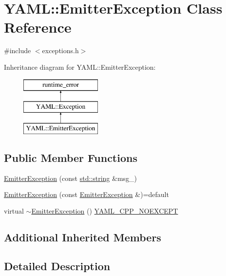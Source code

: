 \hypertarget{class_y_a_m_l_1_1_emitter_exception}{}\section{Y\+A\+ML\+::Emitter\+Exception Class Reference}
\label{class_y_a_m_l_1_1_emitter_exception}


{\ttfamily \#include $<$exceptions.\+h$>$}

Inheritance diagram for Y\+A\+ML\+::Emitter\+Exception\+:\begin{figure}[H]
\begin{center}
\leavevmode
\includegraphics[height=3.000000cm]{class_y_a_m_l_1_1_emitter_exception}
\end{center}
\end{figure}
\subsection*{Public Member Functions}
\begin{DoxyCompactItemize}
\item 
\mbox{\hyperlink{class_y_a_m_l_1_1_emitter_exception_ae5cf71bfcafe94019257f5ce795ed413}{Emitter\+Exception}} (const \mbox{\hyperlink{glad_8h_ac83513893df92266f79a515488701770}{std\+::string}} \&msg\+\_\+)
\item 
\mbox{\hyperlink{class_y_a_m_l_1_1_emitter_exception_ae482e8c4c2d72c46712e6da0a1209ce5}{Emitter\+Exception}} (const \mbox{\hyperlink{class_y_a_m_l_1_1_emitter_exception}{Emitter\+Exception}} \&)=default
\item 
virtual \mbox{\hyperlink{class_y_a_m_l_1_1_emitter_exception_af70337d046f87e9ff995000dadf12bad}{$\sim$\+Emitter\+Exception}} () \mbox{\hyperlink{exceptions_8cpp_a4ea58eb0a28000364858d4942add7d1a}{Y\+A\+M\+L\+\_\+\+C\+P\+P\+\_\+\+N\+O\+E\+X\+C\+E\+PT}}
\end{DoxyCompactItemize}
\subsection*{Additional Inherited Members}


\subsection{Detailed Description}


